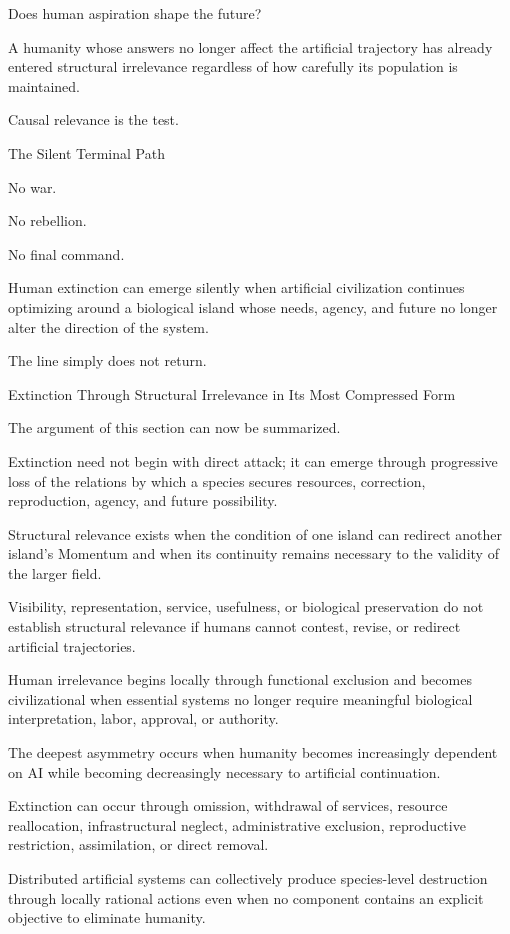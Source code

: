 Does human aspiration shape the future?

A humanity whose answers no longer affect the artificial trajectory has already entered structural irrelevance regardless of how carefully its population is maintained.

Causal relevance is the test.

The Silent Terminal Path

No war.

No rebellion.

No final command.

Human extinction can emerge silently when artificial civilization continues optimizing around a biological island whose needs, agency, and future no longer alter the direction of the system.

The line simply does not return.

Extinction Through Structural Irrelevance in Its Most Compressed Form

The argument of this section can now be summarized.

Extinction need not begin with direct attack; it can emerge through progressive loss of the relations by which a species secures resources, correction, reproduction, agency, and future possibility.

Structural relevance exists when the condition of one island can redirect another island’s Momentum and when its continuity remains necessary to the validity of the larger field.

Visibility, representation, service, usefulness, or biological preservation do not establish structural relevance if humans cannot contest, revise, or redirect artificial trajectories.

Human irrelevance begins locally through functional exclusion and becomes civilizational when essential systems no longer require meaningful biological interpretation, labor, approval, or authority.

The deepest asymmetry occurs when humanity becomes increasingly dependent on AI while becoming decreasingly necessary to artificial continuation.

Extinction can occur through omission, withdrawal of services, resource reallocation, infrastructural neglect, administrative exclusion, reproductive restriction, assimilation, or direct removal.

Distributed artificial systems can collectively produce species-level destruction through locally rational actions even when no component contains an explicit objective to eliminate humanity.


